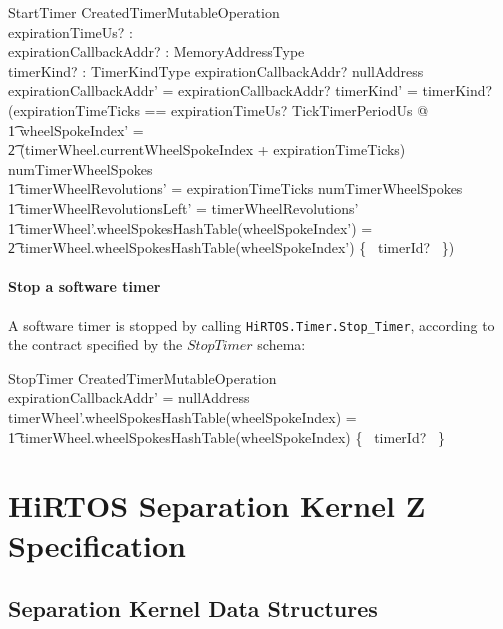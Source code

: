 \documentclass[11pt,letterpaper,twoside,openany]{book}
\begin{document}
\begin{schema}{StartTimer}
   CreatedTimerMutableOperation \\
   expirationTimeUs? : \nat \\
   expirationCallbackAddr? : MemoryAddressType \\
   timerKind? : TimerKindType
\where
   expirationCallbackAddr? \neq nullAddress
\also
   expirationCallbackAddr' = expirationCallbackAddr?
\also
   timerKind' = timerKind?
\also
   (\LET expirationTimeTicks == expirationTimeUs? \div TickTimerPeriodUs @ \\
      \t1 wheelSpokeIndex' = \\
      \t2 (timerWheel.currentWheelSpokeIndex + expirationTimeTicks) \mod numTimerWheelSpokes \land \\
      \t1 timerWheelRevolutions' = expirationTimeTicks \div numTimerWheelSpokes \land \\
      \t1 timerWheelRevolutionsLeft' = timerWheelRevolutions' \land \\
      \t1 timerWheel'.wheelSpokesHashTable(wheelSpokeIndex') = \\
      \t2    timerWheel.wheelSpokesHashTable(wheelSpokeIndex') \cup \{~ timerId? ~\})
\end{schema}

\subsubsection{Stop a software timer}

A software timer is stopped by calling \verb`HiRTOS.Timer.Stop_Timer`, according to the contract
specified by the $StopTimer$ schema:

\begin{schema}{StopTimer}
   CreatedTimerMutableOperation \\
\where
   expirationCallbackAddr' = nullAddress
\also
   timerWheel'.wheelSpokesHashTable(wheelSpokeIndex) = \\
   \t1  timerWheel.wheelSpokesHashTable(wheelSpokeIndex) \setminus \{~ timerId? ~\}
\end{schema}

\clearpage
\chapter{HiRTOS Separation Kernel Z Specification}

\section{Separation Kernel Data Structures}
\end{document}
